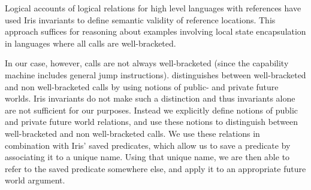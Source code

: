\documentclass[sigplan,review]{acmart}\settopmatter{printfolios=true,printccs=false,printacmref=false}
\begin{document}




Logical accounts of logical relations for high level languages with references have used Iris invariants to define semantic validity of reference locations. This approach suffices for reasoning about 
examples involving local state encapsulation in languages where all calls are well-bracketed.

In our case, however, calls are not always well-bracketed (since the capability machine includes general jump instructions).
\citeauthor{skorstengaardESOP18} distinguishes between well-bracketed and non well-bracketed calls by using notions of public- and private future worlds.
Iris invariants do not make such a distinction and thus invariants alone are not sufficient for our purposes.
Instead we explicitly define notions of public and private future world relations, and use these notions to distinguish between well-bracketed and non well-bracketed calls.
We use these relations in combination with Iris' saved predicates, which allow us to save a predicate by associating it to a unique name.
Using that unique name, we are then able to refer to the saved predicate somewhere else, and apply it to
an appropriate future world argument.
\end{document}
